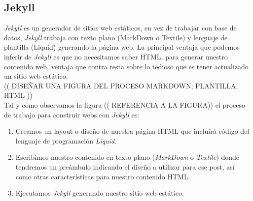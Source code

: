 \documentclass[a4paper, 12pt]{book}
\begin{document}
\subsection{Jekyll}
\label{subsec:jekyll}
\emph{Jekyll} es un generador de sitios web estáticos, en vez de trabajar con base de datos, \emph{Jekyll} trabaja con texto plano (MarkDown o Textile) y lenguaje de plantilla (Liquid)  generando la página web. La principal ventaja que podemos inferir de \emph{Jekyll} es que no necesitamos saber HTML, para generar nuestro contenido web, ventaja que contra resta sobre lo tedioso que es tener actualizado un sitio web estático.   \\
(( DISEÑAR UNA FIGURA DEL PROCESO MARKDOWN; PLANTILLA; HTML ))\\
Tal y como observamos la figura (( REFERENCIA A LA FIGURA)) el proceso de trabajo para construir webs con \emph{Jekyll} es:
\begin{enumerate}
    \item Creamos un layout o diseño de nuestra página HTML que incluirá  código del lenguaje de programación \emph{Liquid}.
    \item Escribimos nuestro contenido en texto plano (\emph{MarkDown} o \emph{Textile}) donde tendremos un preámbulo indicando el diseño a utilizar para ese post, así como otras características para nuestro contenido HTML.
    \item Ejecutamos \emph{Jekyll} generando nuestro sitio web estático.
\end{enumerate}
\end{document}

